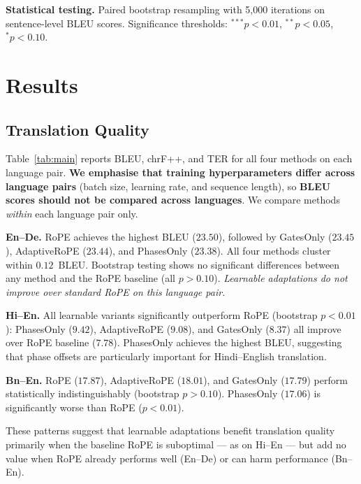 \documentclass[conference]{IEEEtran}
\begin{document}
\textbf{Statistical testing.} Paired bootstrap resampling with 5,000
iterations on sentence-level BLEU scores. Significance thresholds:
$^{***}p<0.01$, $^{**}p<0.05$, $^{*}p<0.10$.

\section{Results}
\label{sec:results}

\subsection{Translation Quality}
\label{sec:quality}

Table~\ref{tab:main} reports BLEU, chrF++, and TER for all four methods on
each language pair. \textbf{We emphasise that training hyperparameters differ
across language pairs} (batch size, learning rate, and sequence length), so
\textbf{BLEU scores should not be compared across languages}. We compare
methods \emph{within} each language pair only.

\textbf{En--De.} RoPE achieves the highest BLEU ($23.50$), followed by
GatesOnly ($23.45$), AdaptiveRoPE ($23.44$), and PhasesOnly ($23.38$). All
four methods cluster within $0.12$~BLEU. Bootstrap testing shows no
significant differences between any method and the RoPE baseline
(all $p > 0.10$). \emph{Learnable adaptations do not improve over standard
RoPE on this language pair.}

\textbf{Hi--En.} All learnable variants significantly outperform RoPE
(bootstrap $p < 0.01$): PhasesOnly ($9.42$), AdaptiveRoPE ($9.08$), and
GatesOnly ($8.37$) all improve over RoPE baseline ($7.78$). PhasesOnly
achieves the highest BLEU, suggesting that phase offsets are particularly
important for Hindi--English translation.

\textbf{Bn--En.} RoPE ($17.87$), AdaptiveRoPE ($18.01$), and GatesOnly
($17.79$) perform statistically indistinguishably (bootstrap $p > 0.10$).
PhasesOnly ($17.06$) is significantly worse than RoPE ($p < 0.01$).

These patterns suggest that learnable adaptations benefit translation
quality primarily when the baseline RoPE is suboptimal --- as on Hi--En
--- but add no value when RoPE already performs well (En--De) or can
harm performance (Bn--En).
\end{document}
